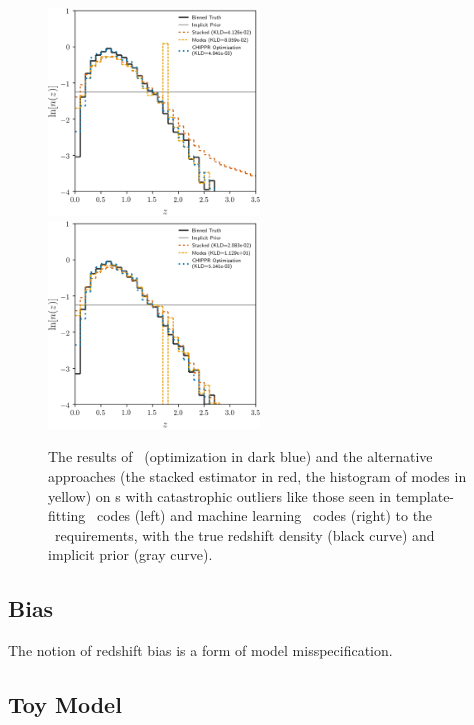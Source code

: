 \begin{figure}
	\includegraphics[width=0.5\textwidth]{figures/chippr/thesis_eout_log_estimators.png}
	\includegraphics[width=0.5\textwidth]{figures/chippr/thesis_rout_log_estimators.png}
	\caption{
		The results of \Chippr\ (optimization in dark blue) and the alternative approaches (the stacked estimator in red, the histogram of modes in yellow) on \pzpdf s with catastrophic outliers like those seen in template-fitting \pzpdf\ codes (left) and machine learning \pzpdf\ codes (right) to the \lsst\ requirements, with the true redshift density (black curve) and implicit prior (gray curve).
	}
\end{figure}

\subsection{Bias}

The notion of redshift bias is a form of model misspecification.

\subsection{Toy Model}

